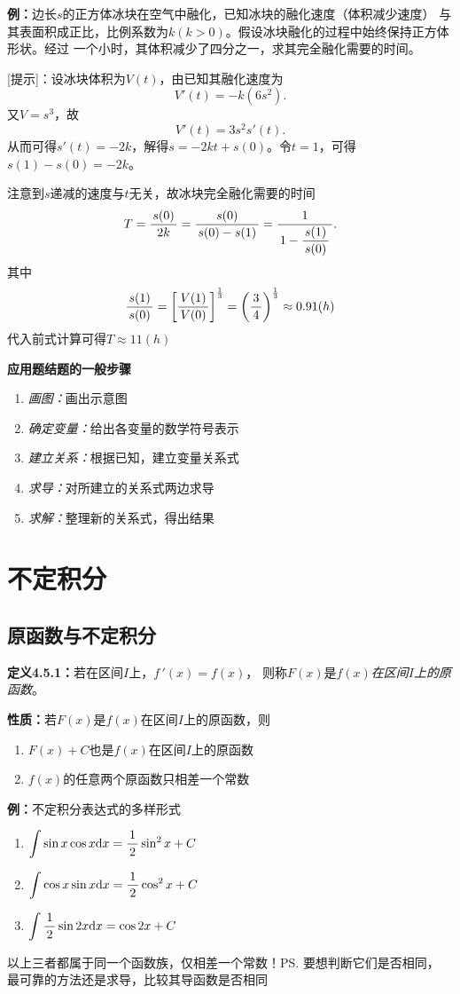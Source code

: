 {\bf 例：}边长$s$的正方体冰块在空气中融化，已知冰块的融化速度（体积减少速度）
与其表面积成正比，比例系数为$k(k>0)$。假设冰块融化的过程中始终保持正方体形状。经过
一个小时，其体积减少了四分之一，求其完全融化需要的时间。

[提示]：设冰块体积为$V(t)$，由已知其融化速度为
$$V'(t)=-k(6s^2).$$
又$V=s^3$，故
$$V'(t)=3s^2s'(t).$$
从而可得$s'(t)=-2k$，解得$s=-2kt+s(0)$。令$t=1$，可得$s(1)-s(0)=-2k$。

注意到$s$递减的速度与$t$无关，故冰块完全融化需要的时间
$$T=\displaystyle\frac{\,{s(0)}\,}{\,{2k}\,}=\displaystyle\frac{\,{s(0)}\,}{\,{s(0)-s(1)}\,}=\displaystyle\frac{\,{1}\,}{\,{1-\displaystyle\frac{\,{s(1)}\,}{\,{s(0)}\,}}\,}.$$
其中
$$\displaystyle\frac{\,{s(1)}\,}{\,{s(0)}\,}=\left[\displaystyle\frac{\,{V(1)}\,}{\,{V(0)}\,}\right]^{\frac13}=
\left(\displaystyle\frac{\,{3}\,}{\,{4}\,}\right)^{\frac13}\approx0.91(h)$$
代入前式计算可得$T\approx11(h)$

\begin{shaded}
{\bf 应用题结题的一般步骤}
\begin{enumerate}
  \setlength{\itemindent}{1cm}
  \item {{\it 画图：}}画出示意图
  \item {{\it 确定变量：}}给出各变量的数学符号表示
  \item {{\it 建立关系：}}根据已知，建立变量关系式
  \item {{\it 求导：}}对所建立的关系式两边求导
  \item {{\it 求解：}}整理新的关系式，得出结果
\end{enumerate}
\end{shaded}

\section{不定积分}

\subsection{原函数与不定积分}

{\bf 定义4.5.1：}若在区间$I$上，$f\,'(x)=f(x)$，
则称$F(x)$是{\it $f(x)$在区间$I$上的原函数}。

{\bf 性质：}若$F(x)$是$f(x)$在区间$I$上的原函数，则
\begin{enumerate}
  \setlength{\itemindent}{1cm}
  \item $F(x)+C$也是$f(x)$在区间$I$上的原函数
  \item $f(x)$的任意两个原函数只相差一个常数
\end{enumerate}

{\bf 例：}不定积分表达式的多样形式
\begin{enumerate}[(1)]
  \setlength{\itemindent}{1cm}
  \item $\displaystyle\int\sin x\cos x\mathrm{d} x=\displaystyle\frac{\,{1}\,}{\,{2}\,}\sin^2x+C$
  \item $\displaystyle\int\cos x\sin x\mathrm{d} x=\displaystyle\frac{\,{1}\,}{\,{2}\,}\cos^2x+C$
  \item $\displaystyle\int\displaystyle\frac{\,{1}\,}{\,{2}\,}\sin2x\mathrm{d} x=\cos2x+C$
\end{enumerate}
以上三者都属于同一个函数族，仅相差一个常数！\ps{要想判断它们是否相同，
最可靠的方法还是求导，比较其导函数是否相同}

